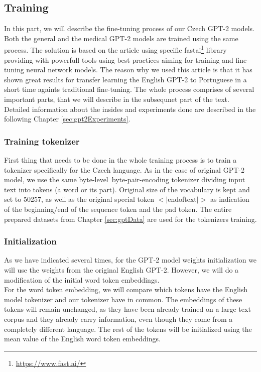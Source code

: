 \subsection{Training}
\label{sec:gpt2Training}
In this part, we will describe the fine-tuning process of our Czech GPT-2 models. Both the general and the medical GPT-2 models are trained using the same process. The solution is based on the \citet{guillou2020faster} article using specific fastai\footnote[6]{\url{https://www.fast.ai/}} library providing with powerfull tools using best practices aiming for training and fine-tuning neural network models. The reason why we used this article is that it has shown great results for transfer learning the English GPT-2 to Portuguese in a short time againts traditional fine-tuning. The whole process comprises of several important parts, that we will describe in the subsequnet part of the text. Detailed information about the insides and experiments done are described in the following Chapter \ref{sec:gpt2Experiments}.

\subsubsection*{Training tokenizer}
First thing that needs to be done in the whole training process is to train a tokenizer specifically for the Czech language. As in the case of original GPT-2 model, we use the same byte-level~byte-pair-encoding\citep{sennrich2015neural} tokenizer dividing input text into tokens (a word or its part). Original size of the vocabulary is kept and set to 50257, as well as the original special token $<|$endoftext$|>$ as indication of the beginning/end of the sequence token and the pad token. The entire prepared datasets from Chapter \ref{sec:gptData} are used for the tokenizers training.

\subsubsection*{Initialization}
As we have indicated several times, for the GPT-2 model weights initialization we will use the weights from the original English GPT-2. However, we will do a modification of the initial word token embeddings.\\

For the word token embedding, we will compare which tokens have the English model tokenizer and our tokenizer have in common. The embeddings of these tokens will remain unchanged, as they have been already trained on a large text corpus and they already carry information, even though they come from a completely different language. The rest of the tokens will be initialized using the mean value of the English word token embeddings.

